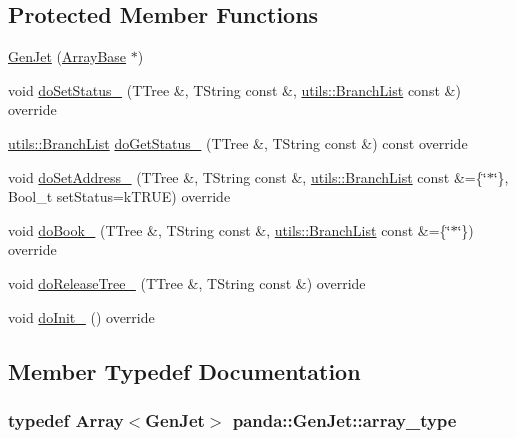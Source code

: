 \subsection*{Protected Member Functions}
\begin{DoxyCompactItemize}
\item 
\hyperlink{classpanda_1_1GenJet_a0725bef4f85c6ecf0cfb57ed149294bb}{GenJet} (\hyperlink{classpanda_1_1ArrayBase}{ArrayBase} $\ast$)
\item 
void \hyperlink{classpanda_1_1GenJet_a519508188c474ac1dcc2c822de9e43c3}{doSetStatus\_\-} (TTree \&, TString const \&, \hyperlink{classpanda_1_1utils_1_1BranchList}{utils::BranchList} const \&) override
\item 
\hyperlink{classpanda_1_1utils_1_1BranchList}{utils::BranchList} \hyperlink{classpanda_1_1GenJet_a5f514a9289d97bd7b6b8731323143269}{doGetStatus\_\-} (TTree \&, TString const \&) const override
\item 
void \hyperlink{classpanda_1_1GenJet_ac0e79d0ee45b00c8477d376f81008204}{doSetAddress\_\-} (TTree \&, TString const \&, \hyperlink{classpanda_1_1utils_1_1BranchList}{utils::BranchList} const \&=\{\char`\"{}$\ast$\char`\"{}\}, Bool\_\-t setStatus=kTRUE) override
\item 
void \hyperlink{classpanda_1_1GenJet_a59196025df6d85eb481e9c47c681e0d7}{doBook\_\-} (TTree \&, TString const \&, \hyperlink{classpanda_1_1utils_1_1BranchList}{utils::BranchList} const \&=\{\char`\"{}$\ast$\char`\"{}\}) override
\item 
void \hyperlink{classpanda_1_1GenJet_a9a787148306f5a612be76c57fbcf0317}{doReleaseTree\_\-} (TTree \&, TString const \&) override
\item 
void \hyperlink{classpanda_1_1GenJet_a7d11efd32c760d452e8014c33ba3b64d}{doInit\_\-} () override
\end{DoxyCompactItemize}


\subsection{Member Typedef Documentation}
\hypertarget{classpanda_1_1GenJet_a732a43640504ffa4b44865f9eb422f74}{
\subsubsection[{array\_\-type}]{\setlength{\rightskip}{0pt plus 5cm}typedef {\bf Array}$<${\bf GenJet}$>$ {\bf panda::GenJet::array\_\-type}}}
\label{classpanda_1_1GenJet_a732a43640504ffa4b44865f9eb422f74}



